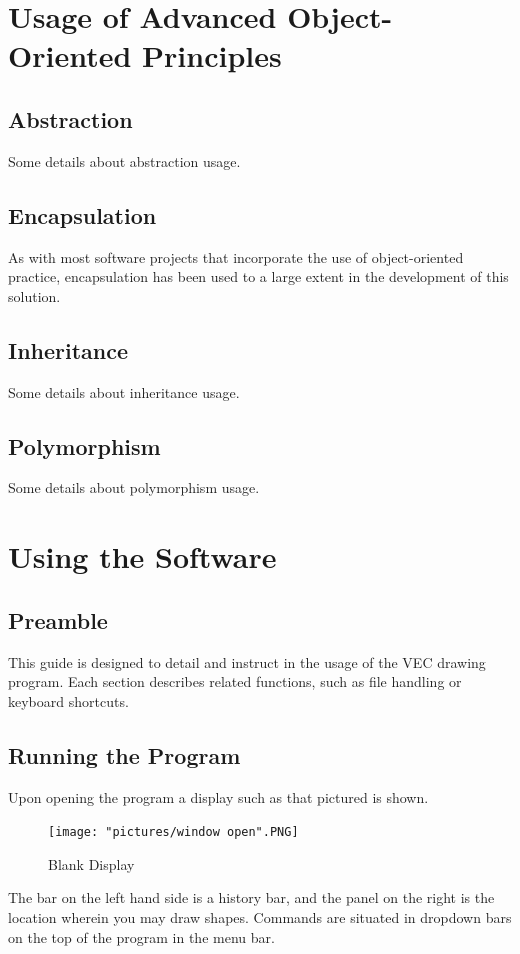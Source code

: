 \documentclass[12pt]{article} %
\begin{document}
\newpage

\section{Usage of Advanced Object-Oriented Principles}
\subsection{Abstraction}
Some details about abstraction usage.
\subsection{Encapsulation}
As with most software projects that incorporate the use of object-oriented practice, encapsulation has been used to a large extent in the development of this solution.
\subsection{Inheritance}
Some details about inheritance usage.
\subsection{Polymorphism}
Some details about polymorphism usage.

\newpage

\section{Using the Software}

\subsection{Preamble}
This guide is designed to detail and instruct in the usage of the VEC drawing program. Each section describes related functions, such as file handling or keyboard shortcuts.

\subsection{Running the Program}
Upon opening the program a display such as that pictured is shown. 

\begin{figure}[hbtp]
\caption{Blank Display}
\centering
\texttt{[image: "pictures/window open".PNG]}
\end{figure}


The bar on the left hand side is a history bar, and the panel on the right is the location wherein you may draw shapes. Commands are situated in dropdown bars on the top of the program in the menu bar. 
\end{document}
